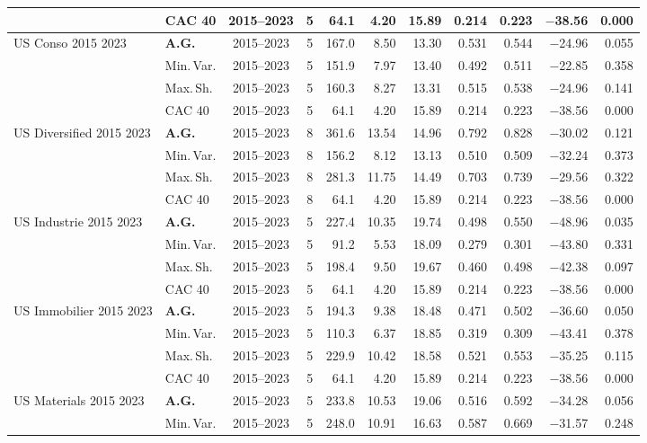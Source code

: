 \begin{longtable}{p{2.6cm} l c c r r r r r r r}
 & CAC 40 & 2015--2023 & 5 & 64.1 & 4.20 & 15.89 & 0.214 & 0.223 & $-$38.56 & 0.000 \\
\midrule
US Conso 2015 2023 & \textbf{A.G.} & 2015--2023 & 5 & 167.0 & 8.50 & 13.30 & 0.531 & 0.544 & $-$24.96 & 0.055 \\
 & Min.\,Var. & 2015--2023 & 5 & 151.9 & 7.97 & 13.40 & 0.492 & 0.511 & $-$22.85 & 0.358 \\
 & Max.\,Sh. & 2015--2023 & 5 & 160.3 & 8.27 & 13.31 & 0.515 & 0.538 & $-$24.96 & 0.141 \\
 & CAC 40 & 2015--2023 & 5 & 64.1 & 4.20 & 15.89 & 0.214 & 0.223 & $-$38.56 & 0.000 \\
\midrule
US Diversified 2015 2023 & \textbf{A.G.} & 2015--2023 & 8 & 361.6 & 13.54 & 14.96 & 0.792 & 0.828 & $-$30.02 & 0.121 \\
 & Min.\,Var. & 2015--2023 & 8 & 156.2 & 8.12 & 13.13 & 0.510 & 0.509 & $-$32.24 & 0.373 \\
 & Max.\,Sh. & 2015--2023 & 8 & 281.3 & 11.75 & 14.49 & 0.703 & 0.739 & $-$29.56 & 0.322 \\
 & CAC 40 & 2015--2023 & 8 & 64.1 & 4.20 & 15.89 & 0.214 & 0.223 & $-$38.56 & 0.000 \\
\midrule
US Industrie 2015 2023 & \textbf{A.G.} & 2015--2023 & 5 & 227.4 & 10.35 & 19.74 & 0.498 & 0.550 & $-$48.96 & 0.035 \\
 & Min.\,Var. & 2015--2023 & 5 & 91.2 & 5.53 & 18.09 & 0.279 & 0.301 & $-$43.80 & 0.331 \\
 & Max.\,Sh. & 2015--2023 & 5 & 198.4 & 9.50 & 19.67 & 0.460 & 0.498 & $-$42.38 & 0.097 \\
 & CAC 40 & 2015--2023 & 5 & 64.1 & 4.20 & 15.89 & 0.214 & 0.223 & $-$38.56 & 0.000 \\
\midrule
US Immobilier 2015 2023 & \textbf{A.G.} & 2015--2023 & 5 & 194.3 & 9.38 & 18.48 & 0.471 & 0.502 & $-$36.60 & 0.050 \\
 & Min.\,Var. & 2015--2023 & 5 & 110.3 & 6.37 & 18.85 & 0.319 & 0.309 & $-$43.41 & 0.378 \\
 & Max.\,Sh. & 2015--2023 & 5 & 229.9 & 10.42 & 18.58 & 0.521 & 0.553 & $-$35.25 & 0.115 \\
 & CAC 40 & 2015--2023 & 5 & 64.1 & 4.20 & 15.89 & 0.214 & 0.223 & $-$38.56 & 0.000 \\
\midrule
US Materials 2015 2023 & \textbf{A.G.} & 2015--2023 & 5 & 233.8 & 10.53 & 19.06 & 0.516 & 0.592 & $-$34.28 & 0.056 \\
 & Min.\,Var. & 2015--2023 & 5 & 248.0 & 10.91 & 16.63 & 0.587 & 0.669 & $-$31.57 & 0.248 \\

\end{longtable}
